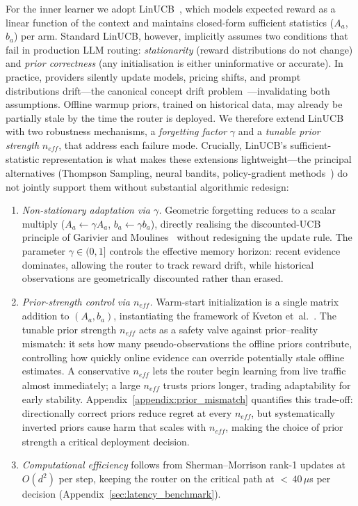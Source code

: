 For the inner learner we adopt LinUCB~\cite{li2010contextual}, which models expected reward as a linear function of the context and maintains closed-form sufficient statistics ($A_a$, $b_a$) per arm.
Standard LinUCB, however, implicitly assumes two conditions that fail in production LLM routing: \emph{stationarity} (reward distributions do not change) and \emph{prior correctness} (any initialisation is either uninformative or accurate).
In practice, providers silently update models, pricing shifts, and prompt distributions drift---the canonical concept drift problem~\cite{gama2014survey,chen2023chatgptdrift}---invalidating both assumptions.
Offline warmup priors, trained on historical data, may already be partially stale by the time the router is deployed.
We therefore extend LinUCB with two robustness mechanisms, a \emph{forgetting factor} $\gamma$ and a \emph{tunable prior strength} $n_\mathit{eff}$, that address each failure mode.
Crucially, LinUCB's sufficient-statistic representation is what makes these extensions lightweight---the principal alternatives (Thompson Sampling, neural bandits, policy-gradient methods~\cite{wang2025barp}) do not jointly support them without substantial algorithmic redesign:
\begin{enumerate}[nosep,leftmargin=*]
  \item \emph{Non-stationary adaptation via $\gamma$.}  Geometric forgetting reduces to a scalar multiply ($A_a \leftarrow \gamma A_a$, $b_a \leftarrow \gamma b_a$), directly realising the discounted-UCB principle of Garivier and Moulines~\cite{garivier2011switching} without redesigning the update rule.  The parameter $\gamma \in (0,1]$ controls the effective memory horizon: recent evidence dominates, allowing the router to track reward drift, while historical observations are geometrically discounted rather than erased.
  \item \emph{Prior-strength control via $n_\mathit{eff}$.}  Warm-start initialization is a single matrix addition to $(A_a, b_a)$, instantiating the framework of Kveton et~al.~\cite{kveton2023warmstart}.  The tunable prior strength $n_\mathit{eff}$ acts as a safety valve against prior--reality mismatch: it sets how many pseudo-observations the offline priors contribute, controlling how quickly online evidence can override potentially stale offline estimates.  A conservative $n_\mathit{eff}$ lets the router begin learning from live traffic almost immediately; a large $n_\mathit{eff}$ trusts priors longer, trading adaptability for early stability.  Appendix~\ref{appendix:prior_mismatch} quantifies this trade-off: directionally correct priors reduce regret at every $n_\mathit{eff}$, but systematically inverted priors cause harm that scales with $n_\mathit{eff}$, making the choice of prior strength a critical deployment decision.
  \item \emph{Computational efficiency} follows from Sherman--Morrison rank-1 updates at $O(d^2)$ per step, keeping the router on the critical path at ${<}\,40\,\mu$s per decision (Appendix~\ref{sec:latency_benchmark}).
\end{enumerate}

